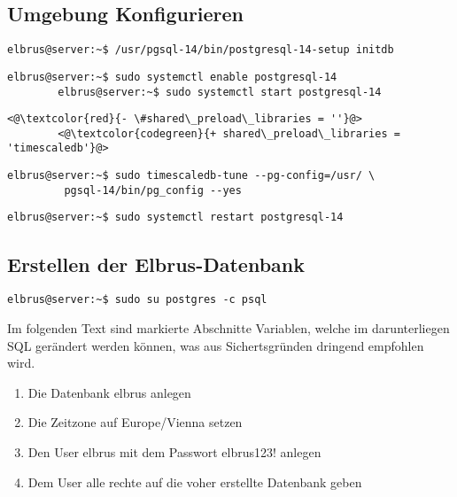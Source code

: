 \documentclass{article}
\begin{document}
	\newpage
	\subsection[TimescaleDB konfigurieren]{Umgebung Konfigurieren}
	\begin{lstlisting}[caption={Initialisieren der Datenbank.}]
		elbrus@server:~$ /usr/pgsql-14/bin/postgresql-14-setup initdb
	\end{lstlisting}
	
	\begin{lstlisting}[caption={Verknüpfen von 'postgresql' Serive Start mit Serverstart sowie den Service starten.}]
		elbrus@server:~$ sudo systemctl enable postgresql-14
		elbrus@server:~$ sudo systemctl start postgresql-14
	\end{lstlisting}

	\lstset{style=files}
	\begin{lstlisting}[caption={var/lib/pgsql/14/data/postgresql.conf - Ändern der folgenden Zeilen}, numbers=none]
		<@\textcolor{red}{- \#shared\_preload\_libraries = ''}@>
		<@\textcolor{codegreen}{+ shared\_preload\_libraries = 'timescaledb'}@>
	\end{lstlisting}
	
	\lstset{style=commands}
	\begin{lstlisting}[caption={Anpassen der Datenbank Einstellungen auf die Server Hardware.}]
		elbrus@server:~$ sudo timescaledb-tune --pg-config=/usr/ \
		 pgsql-14/bin/pg_config --yes
	\end{lstlisting}

	\begin{lstlisting}[caption={Neustarten des Services um Änderungen zu übernehmen.}]
		elbrus@server:~$ sudo systemctl restart postgresql-14
	\end{lstlisting}

	\newpage
	\subsection{Erstellen der Elbrus-Datenbank}
	\begin{lstlisting}[caption={Verbinden mit dem interaktiven Terminal von 'postgres'.}]
		elbrus@server:~$ sudo su postgres -c psql
	\end{lstlisting}

	Im folgenden Text sind markierte Abschnitte Variablen, welche im darunterliegen SQL gerändert werden können, was aus Sichertsgründen dringend empfohlen wird.
	\begin{enumerate}
		\item Die Datenbank elbrus anlegen
		\item Die Zeitzone auf Europe/Vienna setzen
		\item Den User elbrus mit dem Passwort elbrus123! anlegen
		\item Dem User alle rechte auf die voher erstellte Datenbank geben
	\end{enumerate}	
\end{document}
